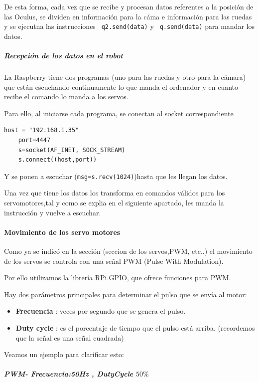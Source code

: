 \documentclass[twoside, 12pt]{epstfg}
\begin{document}
De esta forma, cada vez que se recibe y procesan datos referentes a la posición de las Oculus, se dividen en información para la cáma e información para las ruedas y se ejecutna las instrucciones \texttt{ q2.send(data)}  y \texttt{ q.send(data)} para mandar los datos.
\subparagraph{Recepción de los datos en el robot}

La Raspberry tiene dos programas (uno para las ruedas y otro para la
cámara) que están escuchando continuamente lo que manda el ordenador y en
cuanto recibe el comando lo manda a los servos.

Para ello, al iniciarse cada programa, se conectan al socket correspondiente
\lstset{language=python, breaklines=true, basicstyle=\footnotesize}
\begin{lstlisting}[frame=single]
	host = "192.168.1.35"
	port=4447
	s=socket(AF_INET, SOCK_STREAM)
	s.connect((host,port))
\end{lstlisting}

Y se ponen a escuchar (\texttt{msg=s.recv(1024)})hasta que les llegan los datos.

Una vez que tiene los datos los transforma en comandos válidos para los servomotores,tal y como se explia en el siguiente apartado, les manda la instrucción y vuelve a escuchar.


\paragraph{Movimiento de los servo motores}



Como ya se indicó en la sección (seccion de los servos,PWM, etc..) el movimiento de los servos se controla con una señal PWM (Pulse With Modulation).

Por ello utilizamos la librería RPi.GPIO, que ofrece funciones para PWM.

Hay dos parámetros principales para determinar el pulso que se envía al motor:
\begin{itemize}
	\item \textbf{Frecuencia} : veces por segundo que se genera el pulso.
	\item \textbf{Duty cycle} : es el porcentaje de tiempo que el pulso está arriba. (recordemos que la señal es una señal cuadrada)
\end{itemize}


Veamos un ejemplo para clarificar esto:

\subparagraph{PWM- Frecuencia:50Hz , DutyCycle $50\%$}
\end{document}
